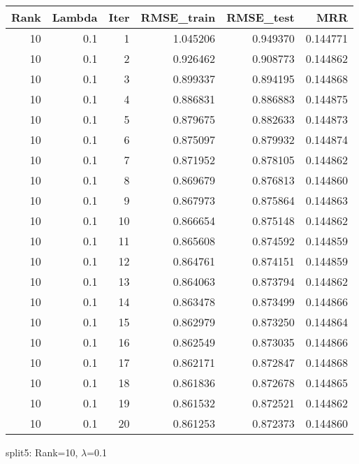 \begin{tabular}{rrrrrr}
\toprule
 Rank &  Lambda &  Iter &  RMSE\_train &  RMSE\_test &       MRR \\
\midrule
   10 &     0.1 &     1 &    1.045206 &   0.949370 &  0.144771 \\
   10 &     0.1 &     2 &    0.926462 &   0.908773 &  0.144862 \\
   10 &     0.1 &     3 &    0.899337 &   0.894195 &  0.144868 \\
   10 &     0.1 &     4 &    0.886831 &   0.886883 &  0.144875 \\
   10 &     0.1 &     5 &    0.879675 &   0.882633 &  0.144873 \\
   10 &     0.1 &     6 &    0.875097 &   0.879932 &  0.144874 \\
   10 &     0.1 &     7 &    0.871952 &   0.878105 &  0.144862 \\
   10 &     0.1 &     8 &    0.869679 &   0.876813 &  0.144860 \\
   10 &     0.1 &     9 &    0.867973 &   0.875864 &  0.144863 \\
   10 &     0.1 &    10 &    0.866654 &   0.875148 &  0.144862 \\
   10 &     0.1 &    11 &    0.865608 &   0.874592 &  0.144859 \\
   10 &     0.1 &    12 &    0.864761 &   0.874151 &  0.144859 \\
   10 &     0.1 &    13 &    0.864063 &   0.873794 &  0.144862 \\
   10 &     0.1 &    14 &    0.863478 &   0.873499 &  0.144866 \\
   10 &     0.1 &    15 &    0.862979 &   0.873250 &  0.144864 \\
   10 &     0.1 &    16 &    0.862549 &   0.873035 &  0.144866 \\
   10 &     0.1 &    17 &    0.862171 &   0.872847 &  0.144868 \\
   10 &     0.1 &    18 &    0.861836 &   0.872678 &  0.144865 \\
   10 &     0.1 &    19 &    0.861532 &   0.872521 &  0.144862 \\
   10 &     0.1 &    20 &    0.861253 &   0.872373 &  0.144860 \\
\bottomrule
\end{tabular}

\caption{split5: Rank=10, $\lambda$=0.1}
